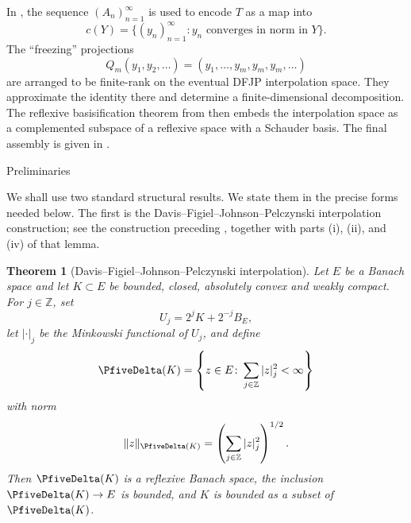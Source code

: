 \documentclass[11pt,reqno]{amsart}
\makeatletter
\theoremstyle{plain}
\newtheorem{theorem}{Theorem}[section]
\theoremstyle{definition}
\newcounter{problempaper}
\newenvironment{problempaperbody}{%
  \setcounter{subsection}{0}%
  \setcounter{subsubsection}{0}%
  \setcounter{paragraph}{0}%
  \renewcommand{\thesubsection}{\arabic{subsection}}%
  \renewcommand{\thesubsubsection}{\thesubsection.\arabic{subsubsection}}%
  \renewcommand{\theparagraph}{\thesubsubsection.\arabic{paragraph}}%
  \let\problem@outersection\section
  \let\problem@outersubsection\subsection
  \let\problem@outersubsubsection\subsubsection
  \let\problem@outerparagraph\paragraph
  \let\section\problem@papersection
  \let\subsection\problem@papersubsection
  \let\subsubsection\problem@papersubsubsection
}{%
  \let\section\problem@outersection
  \let\subsection\problem@outersubsection
  \let\subsubsection\problem@outersubsubsection
  \let\paragraph\problem@outerparagraph
}
\newcommand{\problem@target}[2]{%
  \hypertarget{problem-\theproblempaper-#1-#2}{}%
}
\newcommand{\problem@paperheading}[3]{%
  \par\bigskip
  \problem@target{#1}{#2}%
  \noindent{\large\bfseries #2.\quad #3\par}%
  \nobreak\smallskip
}
\newcommand{\problem@papersubheading}[3]{%
  \par\medskip
  \problem@target{#1}{#2}%
  \noindent{\normalsize\bfseries #2.\quad #3\par}%
  \nobreak\smallskip
}
\newcommand{\problem@papersubsubheading}[3]{%
  \par\smallskip
  \problem@target{#1}{#2}%
  \noindent{\normalsize\itshape #2.\quad #3.\ }%
}
\def\problem@papersection{%
  \@ifstar{\problem@papersectionstar}{\problem@papersectionnostar}%
}
\def\problem@papersectionstar#1{%
  \par\bigskip\noindent{\large\bfseries #1\par}\nobreak\smallskip
}
\def\problem@papersectionnostar#1{%
  \refstepcounter{subsection}%
  \setcounter{subsubsection}{0}%
  \setcounter{paragraph}{0}%
  \problem@paperheading{section}{\thesubsection}{#1}%
  \problem@writecontentsline{section}{\thesubsection}{#1}%
}
\def\problem@papersubsection{%
  \@ifstar{\problem@papersubsectionstar}{\problem@papersubsectionnostar}%
}
\def\problem@papersubsectionstar#1{%
  \par\medskip\noindent{\normalsize\bfseries #1\par}\nobreak\smallskip
}
\def\problem@papersubsectionnostar#1{%
  \refstepcounter{subsubsection}%
  \setcounter{paragraph}{0}%
  \problem@papersubheading{subsection}{\thesubsubsection}{#1}%
  \problem@writecontentsline{subsection}{\thesubsubsection}{#1}%
}
\def\problem@papersubsubsection{%
  \@ifstar{\problem@papersubsubsectionstar}{\problem@papersubsubsectionnostar}%
}
\def\problem@papersubsubsectionstar#1{%
  \par\smallskip\noindent{\normalsize\itshape #1.\ }%
}
\def\problem@papersubsubsectionnostar#1{%
  \refstepcounter{paragraph}%
  \problem@papersubsubheading{subsubsection}{\theparagraph}{#1}%
  \problem@writecontentsline{subsubsection}{\theparagraph}{#1}%
}
\newcommand{\problem@writecontentsline}[3]{%
  \begingroup
  \protected@write\@auxout{}{%
    \string\problemcontentsentry{\theproblempaper}{#1}{#2}{#3}{\thepage}%
  }%
  \endgroup
}
\newcommand{\problemcontentsentry}[5]{%
  \@ifundefined{problemcontents@#1}{%
    \expandafter\gdef\csname problemcontents@#1\endcsname{}%
  }{}%
  \expandafter\g@addto@macro\csname problemcontents@#1\endcsname{%
    \problemcontentsline{#1}{#2}{#3}{#4}{#5}%
  }%
}
\newcommand{\problemcontentslink}[4]{%
  \hyperlink{problem-#1-#2-#3}{#4}%
}
\newcommand{\problemcontentsline}[5]{%
  \ifstrequal{#2}{section}{%
    \par\noindent
    \problemcontentslink{#1}{#2}{#3}{\makebox[2.5em][l]{#3}#4}%
    \nobreak\dotfill
    \problemcontentslink{#1}{#2}{#3}{#5}\par
  }{%
    \ifstrequal{#2}{subsection}{%
      \par\noindent\hspace*{1.5em}%
      \problemcontentslink{#1}{#2}{#3}{\makebox[3.5em][l]{#3}#4}%
      \nobreak\dotfill
      \problemcontentslink{#1}{#2}{#3}{#5}\par
    }{%
      \par\noindent\hspace*{3em}%
      \problemcontentslink{#1}{#2}{#3}{\makebox[4.5em][l]{#3}#4}%
      \nobreak\dotfill
      \problemcontentslink{#1}{#2}{#3}{#5}\par
    }%
  }%
}
\makeatother
\begin{document}
\begin{problempaperbody}
In , the sequence $(A_n)_{n=1}^\infty$ is used to encode $T$ as a map into
\begin{equation*}
c(Y)=\{(y_n)_{n=1}^{\infty}\colon y_n\text{ converges in norm in }Y\}.
\end{equation*}
The ``freezing'' projections
\begin{equation*}
Q_m(y_1,y_2,\ldots)=(y_1,\ldots,y_m,y_m,y_m,\ldots)
\end{equation*}
are arranged to be finite-rank on the eventual DFJP interpolation space. They approximate the identity there and determine a finite-dimensional decomposition. The reflexive basisification theorem from  then embeds the interpolation space as a complemented subspace of a reflexive space with a Schauder basis. The final assembly is given in .


\section{Preliminaries}
\label{p5:sec:preliminaries}

We shall use two standard structural results. We state them in the precise forms needed below. The first is the Davis--Figiel--Johnson--Pelczynski interpolation construction; see the construction preceding \cite[Lemma~1]{DavisFigielJohnsonPelczynski1974}, together with parts \textup{(i)}, \textup{(ii)}, and \textup{(iv)} of that lemma.

\begin{theorem}[Davis--Figiel--Johnson--Pelczynski interpolation]
\label{p5:thm:dfjp-interpolation}
Let $E$ be a Banach space and let $K\subset E$ be bounded, closed, absolutely convex and weakly compact. For $j\in\mathbb Z$, set
\begin{equation*}
        U_j=2^jK+2^{-j}B_E,
\end{equation*}
let $|\cdot|_j$ be the Minkowski functional of $U_j$, and define
\begin{equation*}
        \PfiveDelta(K)=\left\{z\in E\colon \sum_{j\in\mathbb Z}|z|_j^2<\infty\right\}
\end{equation*}
with norm
\begin{equation*}
        \|z\|_{\PfiveDelta(K)}=\left(\sum_{j\in\mathbb Z}|z|_j^2\right)^{1/2}.
\end{equation*}
Then $\PfiveDelta(K)$ is a reflexive Banach space, the inclusion $\PfiveDelta(K)\to E$ is bounded, and $K$ is bounded as a subset of $\PfiveDelta(K)$.
\end{theorem}


\end{problempaperbody}
\end{document}
